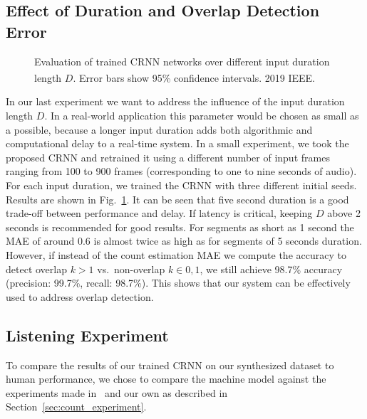 \subsection{Effect of Duration and Overlap Detection Error}%
\label{ssec:exp_duration}

\begin{figure}[h!]
   \centering
   \centering
   \begin{adjustbox}{width=0.7\columnwidth}
     
   \end{adjustbox}
   \caption{Evaluation of trained CRNN networks over different input duration length \(D\). Error bars show 95\% confidence intervals. \textsuperscript{\textregistered} 2019 IEEE.}%
   \label{fig:timesteps}
\end{figure}

In our last experiment we want to address the influence of the input duration length \(D\).
In a real-world application this parameter would be chosen as small as a possible, because a longer input duration adds both algorithmic and computational delay to a real-time system.
In a small experiment, we took the proposed CRNN and retrained it using a different number of input frames ranging from 100 to 900 frames (corresponding to one to nine seconds of audio).
For each input duration, we trained the CRNN with three different initial seeds.
Results are shown in Fig.~\ref{fig:timesteps}.
It can be seen that five second duration is a good trade-off between performance and delay.
If latency is critical, keeping \(D\) above 2 seconds is recommended for good results.
For segments as short as 1 second the MAE of around 0.6 is almost twice as high as for segments of 5 seconds duration.
However, if instead of the count estimation MAE we compute the accuracy to detect overlap \(k > 1\) vs.\ non-overlap \(k \in {0, 1}\), we still achieve 98.7\% accuracy (precision: 99.7\%, recall: 98.7\%). This shows that our system can be effectively used to address overlap detection.

\subsection{Listening Experiment}%
\label{ssec:listening_experiment}
To compare the results of our trained CRNN on our synthesized dataset to human performance, we chose to compare the machine model against the experiments made in~\cite{kawashima15, kashino96} and our own as described in Section~\ref{sec:count_experiment}.


